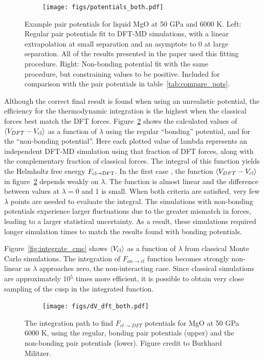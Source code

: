 \begin{figure}[h!]  
    \centering
    \texttt{[image: figs/potentials\_both.pdf]}
\caption{Example pair potentials for liquid MgO at 50 GPa and 6000 K. Left: 
  Regular pair potentials fit to DFT-MD simulations, with a linear
  extrapolation at small separation and an asymptote to 0 at large
  separation.  All of the results presented in the paper used this fitting
  procedure. Right: Non-bonding potential fit with the same procedure, but
  constraining values to be positive. Included for comparison with the pair
  potentials in table~\ref{tab:compare_pots}.}
\label{fig:potentials}
\end{figure}


Although the correct final result is found when using an unrealistic
potential, the efficiency for the thermodynamic integration is the highest
when the classical forces best match the DFT forces.
Figure~\ref{fig:integrate_dft} shows the calculated values of $\left<
V_{DFT} - V_{\rm cl} \right>$ as a function of $\lambda$ using the regular
``bonding'' potential, and for the ``non-bonding potential''. Here each
plotted value of lambda represents an independent DFT-MD simulation 
using that fraction of DFT forces, along with the complementary fraction of
classical forces. The integral of this function yields the Helmholtz free
energy $F_{\rm cl \to DFT}$. In the first case , the function $\left<
V_{DFT}-V_{\rm cl}\right>$ in figure~\ref{fig:integrate_dft} depends weakly
on $\lambda$. The function is almost linear and the difference between
values at $\lambda=0$ and 1 is small. When both criteria are satisfied,
very few $\lambda$ points are needed to evaluate the integral. The
simulations with non-bonding potentials experience larger fluctuations  due
to the greater mismatch in forces, leading to a larger statistical
uncertainty.  As a result, these simulations required longer simulation
times to match the results found with bonding potentials.

Figure~\ref{fig:integrate_cmc} shows $\left< V_{\rm cl} \right>$ as a function
of $\lambda$ from classical Monte Carlo simulations. The integration of
$F_{an \to cl}$ function becomes strongly non-linear as $\lambda$
approaches zero, the non-interacting case. Since classical simulations are
approximately 10$^5$ times more efficient, it is possible to obtain very
close sampling of the cusp in the integrated function. 

\begin{figure}[h!]  
  \centering
    \texttt{[image: figs/dV\_dft\_both.pdf]}
\caption{The integration path to find $F_{cl \to DFT}$ potentials for MgO
at 50 GPa 6000 K, using the regular, bonding pair potentials (upper) and
the non-bonding pair potentials (lower). Figure credit to Burkhard Militzer. }
\label{fig:integrate_dft}
\end{figure}

